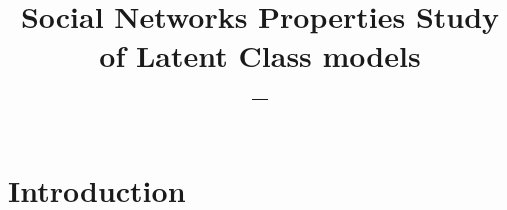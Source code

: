 \documentclass[a4paper, 12pt]{article}
\title{
      \Large{Social Networks Properties Study of Latent Class models}\\
            --\\ }
\begin{document}
\maketitle

\section{Introduction}
%
%
%
%
%
%
%
%
%
%
%
%
\end{document}
